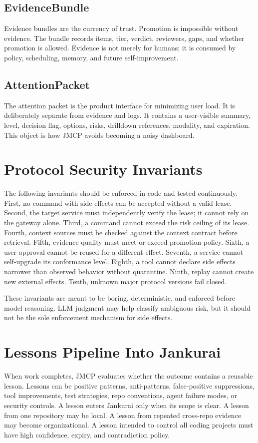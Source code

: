 \documentclass[10pt,journal,onecolumn]{IEEEtran}
\begin{document}
\subsection{EvidenceBundle}
Evidence bundles are the currency of trust. Promotion is impossible without evidence. The bundle records items, tier, verdict, reviewers, gaps, and whether promotion is allowed. Evidence is not merely for humans; it is consumed by policy, scheduling, memory, and future self-improvement.

\subsection{AttentionPacket}
The attention packet is the product interface for minimizing user load. It is deliberately separate from evidence and logs. It contains a user-visible summary, level, decision flag, options, risks, drilldown references, modality, and expiration. This object is how JMCP avoids becoming a noisy dashboard.

\section{Protocol Security Invariants}
The following invariants should be enforced in code and tested continuously. First, no command with side effects can be accepted without a valid lease. Second, the target service must independently verify the lease; it cannot rely on the gateway alone. Third, a command cannot exceed the risk ceiling of its lease. Fourth, context sources must be checked against the context contract before retrieval. Fifth, evidence quality must meet or exceed promotion policy. Sixth, a user approval cannot be reused for a different effect. Seventh, a service cannot self-upgrade its conformance level. Eighth, a tool cannot declare side effects narrower than observed behavior without quarantine. Ninth, replay cannot create new external effects. Tenth, unknown major protocol versions fail closed.

These invariants are meant to be boring, deterministic, and enforced before model reasoning. LLM judgment may help classify ambiguous risk, but it should not be the sole enforcement mechanism for side effects.

\section{Lessons Pipeline Into Jankurai}
When work completes, JMCP evaluates whether the outcome contains a reusable lesson. Lessons can be positive patterns, anti-patterns, false-positive suppressions, tool improvements, test strategies, repo conventions, agent failure modes, or security controls. A lesson enters Jankurai only when its scope is clear. A lesson from one repository may be local. A lesson from repeated cross-repo evidence may become organizational. A lesson intended to control all coding projects must have high confidence, expiry, and contradiction policy.
\end{document}
